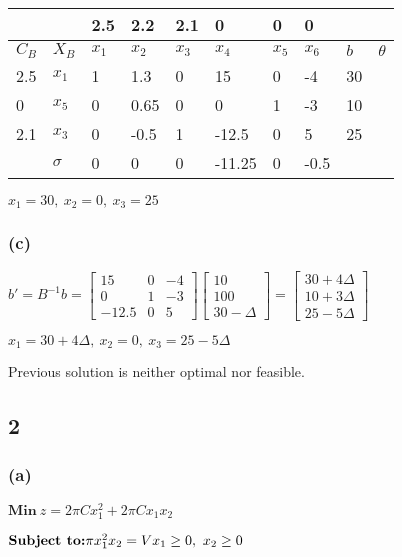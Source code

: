 \documentclass{article}
\begin{document}
\par\indent
\par
\begin{tabular}{|l|l|l|l|l|l|l|l|l|l|}
\hline
         &                       & 2.5      & 2.2      & 2.1      & 0        & 0        & 0        &     &                       \\ \hline
$C_{B}$ & $X_{B}$              & $x_{1}$ & $x_{2}$ & $x_{3}$ & $x_{4}$ & $x_{5}$ & $x_{6}$ & $b$   & $\theta$ \\
\hline2.5&$x_{1}$& 1   & 1.3   & 0  & 15    & 0 & -4 & 30  & \\
\hline0  &$x_{5}$& 0   & 0.65  & 0  & 0 & 1 & -3 & 10 & \\
\hline2.1  &$x_{3}$& 0   & -0.5  & 1  & -12.5 & 0 & 5 & 25  & \\
\hline&$\sigma$ & 0    & 0 & 0  & -11.25& 0 & -0.5 &     &\\
\hline
\end{tabular}\par\indent
\par\indent
\par
$x_{1}=30, \ x_{2}=0, \ x_{3}=25$



\subsubsection*{(c)}
$b'=B^{-1}b=\begin{bmatrix}
15 & 0 & -4\\
0 & 1 & -3\\
-12.5 & 0 & 5
\end{bmatrix}\begin{bmatrix}
10\\
100\\
30-\Delta
\end{bmatrix}=\begin{bmatrix}
30+4\Delta\\
10+3\Delta\\
25-5\Delta
\end{bmatrix}$\par\indent
\par
$x_{1}=30+4\Delta, \ x_{2}=0, \ x_{3}=25-5\Delta$\par
Previous solution is neither optimal nor feasible.
\subsection*{2}
\subsubsection*{(a)}
$\textbf{Min} \  z=2\pi Cx_{1}^{2}+2\pi Cx_{1}x_{2}$\par\indent
\par
$\textbf{Subject to:} \\ 
\pi x_{1}^{2}x_{2}=V\\
x_{1}\geq0, \ x_{2}\geq0
$
\end{document}
